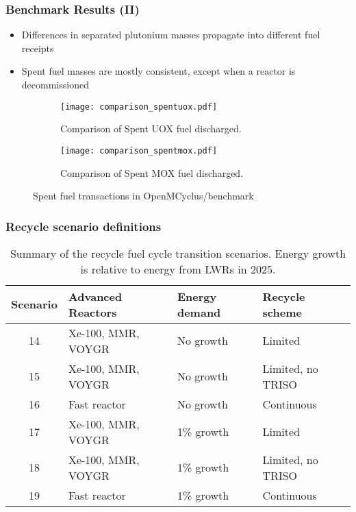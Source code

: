 \begin{frame}
    \frametitle{Benchmark Results (II)}
        \begin{itemize}
            \item Differences in separated plutonium masses 
                  propagate into different fuel receipts 
            \item Spent fuel masses are mostly consistent, except 
                  when a reactor is decommissioned
        \end{itemize}
        \begin{figure}
            \centering
            \begin{subfigure}{0.48\textwidth}
                \texttt{[image: comparison\_spentuox.pdf]}
                \caption{Comparison of Spent UOX fuel discharged.}
            \end{subfigure}
            \hfill
            \begin{subfigure}{0.48\textwidth}
                \texttt{[image: comparison\_spentmox.pdf]}
                \caption{Comparison of Spent MOX fuel discharged.}
            \end{subfigure}
            \caption{Spent fuel transactions in OpenMCyclus/\Cycamore benchmark}
            \label{fig:spentfuel_benchmark}
        \end{figure}

\end{frame}

\begin{frame}
    \frametitle{Recycle scenario definitions}
    \begin{table}[ht]
        \centering
        \caption{Summary of the recycle fuel cycle transition scenarios.
        Energy growth is relative to energy from \glspl{LWR} in 2025.}
        \label{tab:scenarios_recycle}
        \begin{tabular}{c l l l}
            \hline
            Scenario & Advanced Reactors & Energy demand & Recycle scheme\\\hline
            \rowcolor{lightgray}14 & Xe-100, MMR, VOYGR & No growth & Limited \\
            \rowcolor{lightgray}15 & Xe-100, MMR, VOYGR & No growth & Limited, no TRISO\\
            \rowcolor{lightgray}16 & Fast reactor & No growth & Continuous \\
            \rowcolor{lightpink}17 & Xe-100, MMR, VOYGR & 1\% growth & Limited \\
            \rowcolor{lightpink}18 & Xe-100, MMR, VOYGR & 1\% growth & Limited, no TRISO\\
            \rowcolor{lightpink}19 & Fast reactor & 1\% growth & Continuous\\
            \hline
    \end{tabular}
    \end{table}
\end{frame}

